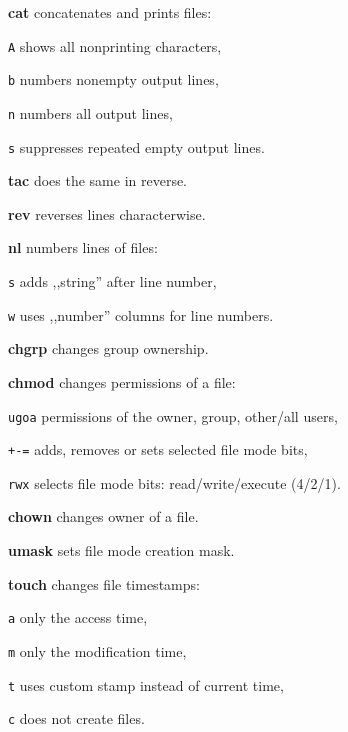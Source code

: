 \begin{enumx}
	\item [\cmdblack] \textbf{cat} concatenates and prints files:
	\item [\texttt{A}] shows all nonprinting characters,
	\item [\texttt{b}] numbers nonempty output lines,
	\item [\texttt{n}] numbers all output lines,
	\item [\texttt{s}] suppresses repeated empty output lines.
	\item [\cmdblack] \textbf{tac} does the same in reverse.
	\item [\cmd] \textbf{rev} reverses lines characterwise.
	\item [\cmdblack] \textbf{nl} numbers lines of files:
	\item [\texttt{s}] adds ,,string'' after line number,
	\item [\texttt{w}] uses ,,number'' columns for line numbers.
\end{enumx}

\begin{enumx}
	\item [\cmdblack] \textbf{chgrp} changes group ownership.
	
	\item [\cmdblack] \textbf{chmod} changes permissions of a file:
	\item [\texttt{ugoa}] permissions of the owner, group, other/all users,
	\item [\texttt{+-=}] adds, removes or sets selected file mode bits,
	\item [\texttt{rwx}] selects file mode bits: read/write/execute (4/2/1).
	
	\item [\cmdblack] \textbf{chown} changes owner of a file.
	
	\item [\cmd] \textbf{umask} sets file mode creation mask.

	\item [\cmdblack] \textbf{touch} changes file timestamps:
	\item [\texttt{a}] only the access time,
	\item [\texttt{m}] only the modification time,
	\item [\texttt{t}] uses custom stamp instead of current time,
	\item [\texttt{c}] does not create files.
\end{enumx}

